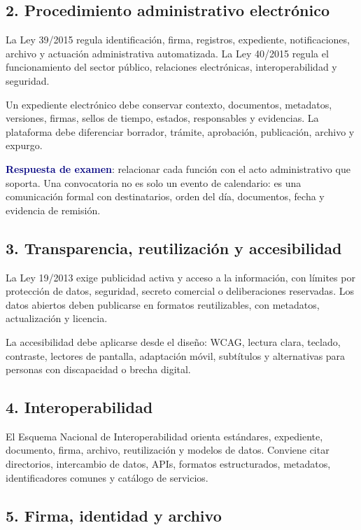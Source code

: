 \documentclass[11pt,a4paper]{article}
\newcommand{\key}[1]{\textbf{\textcolor{navy}{#1}}}
\begin{document}
\subsection{2. Procedimiento administrativo electrónico}

La Ley 39/2015 regula identificación, firma, registros, expediente, notificaciones, archivo y actuación administrativa automatizada. La Ley 40/2015 regula el funcionamiento del sector público, relaciones electrónicas, interoperabilidad y seguridad.

Un expediente electrónico debe conservar contexto, documentos, metadatos, versiones, firmas, sellos de tiempo, estados, responsables y evidencias. La plataforma debe diferenciar borrador, trámite, aprobación, publicación, archivo y expurgo.

\key{Respuesta de examen}: relacionar cada función con el acto administrativo que soporta. Una convocatoria no es solo un evento de calendario: es una comunicación formal con destinatarios, orden del día, documentos, fecha y evidencia de remisión.

\subsection{3. Transparencia, reutilización y accesibilidad}

La Ley 19/2013 exige publicidad activa y acceso a la información, con límites por protección de datos, seguridad, secreto comercial o deliberaciones reservadas. Los datos abiertos deben publicarse en formatos reutilizables, con metadatos, actualización y licencia.

La accesibilidad debe aplicarse desde el diseño: WCAG, lectura clara, teclado, contraste, lectores de pantalla, adaptación móvil, subtítulos y alternativas para personas con discapacidad o brecha digital.

\subsection{4. Interoperabilidad}

El Esquema Nacional de Interoperabilidad orienta estándares, expediente, documento, firma, archivo, reutilización y modelos de datos. Conviene citar directorios, intercambio de datos, APIs, formatos estructurados, metadatos, identificadores comunes y catálogo de servicios.

\subsection{5. Firma, identidad y archivo}
\end{document}
